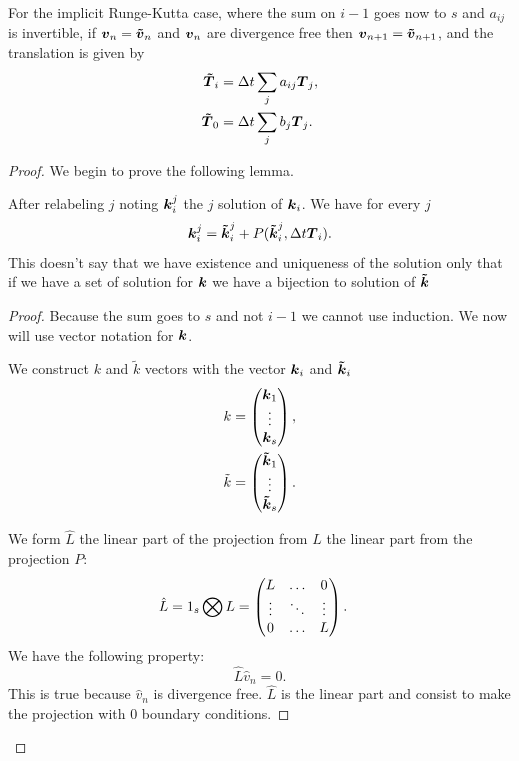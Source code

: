 \begin{theorem}
For the implicit Runge-Kutta case, where the sum on $i-1$ goes now to $s$ and $a_{ij}$ is invertible,
if ${\boldsymbol {v}}_{n}={\boldsymbol {\tilde{v}}}_{n}$ and ${\boldsymbol {v}}_n$ are divergence free then ${\boldsymbol {v}}_{n+1}={\boldsymbol {\tilde{v}}}_{n+1}$,
and the translation is given by
\begin{align}
  {\boldsymbol {\tilde{T}}}_{i}&=\Delta t\sum_{j}a_{ij}{\boldsymbol {T}}_{j},\\
  {\boldsymbol {\tilde{T}}}_{0}&=\Delta t\sum_{j}b_{j}{\boldsymbol {T}}_{j}.
\end{align}

\end{theorem}
\begin{proof}
We begin to prove the following lemma.
\begin{lemma}
After relabeling $j$ noting ${\boldsymbol {k}}_{i}^{j}$ the $j$ solution of ${\boldsymbol {k}}_{i}$.
We have for every $j$
\begin{equation}
  {\boldsymbol {k}}_{i}^{j}={\boldsymbol {\tilde{k}}}_{i}^{j}+P({\boldsymbol {\tilde{k}}}_{i}^{j},\Delta t {\boldsymbol {T}}_{i}).
\end{equation}
This doesn't say that we have existence and uniqueness of the solution only that if we have a set of solution for ${\boldsymbol {k}}$ we have a bijection
to solution of ${\boldsymbol {\tilde{k}}}$
\end{lemma}
\begin{proof}
Because the sum goes to $s$ and not $i-1$ we cannot use induction.
We now will use vector notation for ${\boldsymbol {k}}$.

We construct $k$ and $\tilde{k}$ vectors with the vector ${\boldsymbol {k}}_{i}$ and ${\boldsymbol {\tilde{k}}}_{i}$
\begin{align}
k&=\begin{pmatrix}
    {\boldsymbol {k}}_{1}\\
    \vdots\\
    {\boldsymbol {k}}_{s}\\
  \end{pmatrix},\\
\tilde{k}&=\begin{pmatrix}
    {\boldsymbol {\tilde{k}}}_{1}\\
    \vdots\\
    {\boldsymbol {\tilde{k}}}_{s}\\
  \end{pmatrix}.
\end{align}

We form $\hat{L}$ the linear part of the projection from $L$ the linear part from the projection $P$:
\begin{align}
\hat{L}&=1_{s}\bigotimes L=\begin{pmatrix}L	&\ldots	&0\\
			\vdots &\ddots 	&\vdots\\
			0	&\ldots	&L\\
	\end{pmatrix}.
\end{align}
We have the following property:
\begin{equation}
\hat{L}\hat{v}_{n}=0.
\end{equation}
This is true because $\hat{v}_{n}$ is divergence free.
$\hat{L}$ is the linear part and consist to make the projection with 0 boundary conditions.


\end{proof}
\end{proof}
